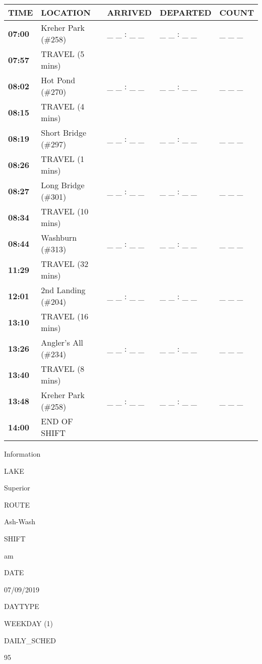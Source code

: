 \documentclass[]{article}
\begin{document}
\begin{tabular}{>{\bfseries}lllll}
\toprule
\textbf{TIME} & \textbf{LOCATION} & \textbf{ARRIVED} & \textbf{DEPARTED} & \textbf{COUNT}\\
\midrule
07:00 & Kreher Park (\#258) & \_ \_ : \_ \_ & \_ \_ : \_ \_ & \_ \_ \_\\
07:57 & TRAVEL (5 mins) &  &  & \\
08:02 & Hot Pond (\#270) & \_ \_ : \_ \_ & \_ \_ : \_ \_ & \_ \_ \_\\
08:15 & TRAVEL (4 mins) &  &  & \\
08:19 & Short Bridge (\#297) & \_ \_ : \_ \_ & \_ \_ : \_ \_ & \_ \_ \_\\
08:26 & TRAVEL (1 mins) &  &  & \\
08:27 & Long Bridge (\#301) & \_ \_ : \_ \_ & \_ \_ : \_ \_ & \_ \_ \_\\
08:34 & TRAVEL (10 mins) &  &  & \\
08:44 & Washburn (\#313) & \_ \_ : \_ \_ & \_ \_ : \_ \_ & \_ \_ \_\\
11:29 & TRAVEL (32 mins) &  &  & \\
12:01 & 2nd Landing (\#204) & \_ \_ : \_ \_ & \_ \_ : \_ \_ & \_ \_ \_\\
13:10 & TRAVEL (16 mins) &  &  & \\
13:26 & Angler's All (\#234) & \_ \_ : \_ \_ & \_ \_ : \_ \_ & \_ \_ \_\\
13:40 & TRAVEL (8 mins) &  &  & \\
13:48 & Kreher Park (\#258) & \_ \_ : \_ \_ & \_ \_ : \_ \_ & \_ \_ \_\\
14:00 & END OF SHIFT &  &  & \\
\bottomrule
\end{tabular}\newpage

Information

LAKE

Superior

ROUTE

Ash-Wash

SHIFT

am

DATE

07/09/2019

DAYTYPE

WEEKDAY (1)

DAILY\_SCHED

95

\vspace{24pt}
\end{document}
